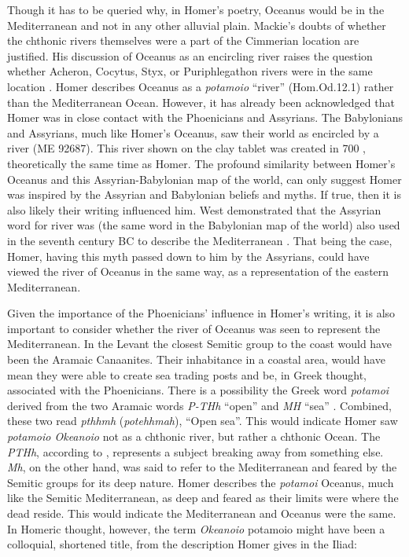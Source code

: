 	Though it has to be queried why, in Homer’s poetry, Oceanus would be in the Mediterranean and not in any other alluvial plain. Mackie’s doubts of whether the chthonic rivers themselves were a part of the Cimmerian location are justified. His discussion of Oceanus as an encircling river raises the question whether Acheron, Cocytus, Styx, or Puriphlegathon rivers were in the same location \parencite[486]{Mackie1999}. Homer describes Oceanus as a \emph{potamoio} “river” (Hom.Od.12.1) rather than the Mediterranean Ocean. However, it has already been acknowledged that Homer was in close contact with the Phoenicians and Assyrians. The Babylonians and Assyrians, much like Homer’s Oceanus, saw their world as encircled by a river (ME 92687). This river shown on the clay tablet was created in 700 \BC, theoretically the same time as Homer. The profound similarity between Homer’s Oceanus and this Assyrian-Babylonian map of the world, can only suggest Homer was inspired by the Assyrian and Babylonian beliefs and myths. If true, then it is also likely their writing influenced him. West demonstrated that the Assyrian word for river was (the same word in the Babylonian map of the world) also used in the seventh century BC to describe the Mediterranean \parencite[145]{West1997}. That being the case, Homer, having this myth passed down to him by the Assyrians, could have viewed the river of Oceanus in the same way, as a representation of the eastern Mediterranean.
		
	Given the importance of the Phoenicians’ influence in Homer’s writing, it is also important to consider whether the river of Oceanus was seen to represent the Mediterranean. In the Levant the closest Semitic group to the coast would have been the Aramaic Canaanites. Their inhabitance in a coastal area, would have mean they were able to create sea trading posts and be, in Greek thought, associated with the Phoenicians. There is a possibility the Greek word \emph{potamoi} derived from the two Aramaic words \emph{P-THh} “open” \parencite[422]{Benner2005} and \emph{MH} “sea” \parencite[166]{Benner2005}. Combined, these two read \emph{pthhmh} (\emph{potehhmah}), “Open sea”. This would indicate Homer saw \emph{potamoio Okeanoio} not as a chthonic river, but rather a chthonic Ocean. The \emph{PTHh}, according to \textcite{Benner2005}, represents a subject breaking away from something else. \emph{Mh}, on the other hand, was said to refer to the Mediterranean and feared by the Semitic groups for its deep nature. Homer describes the \emph{potamoi} Oceanus, much like the Semitic Mediterranean, as deep and feared as their limits were where the dead reside. This would indicate the Mediterranean and Oceanus were the same.  In Homeric thought, however, the term \emph{Okeanoio} potamoio might have been a colloquial, shortened title, from the description Homer gives in the Iliad:
	
